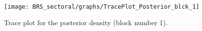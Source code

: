 \begin{figure}[H]
\centering
  \texttt{[image: BRS\_sectoral/graphs/TracePlot\_Posterior\_blck\_1]}\\
    \caption{Trace plot for the posterior density (block number 1).}
\end{figure}
